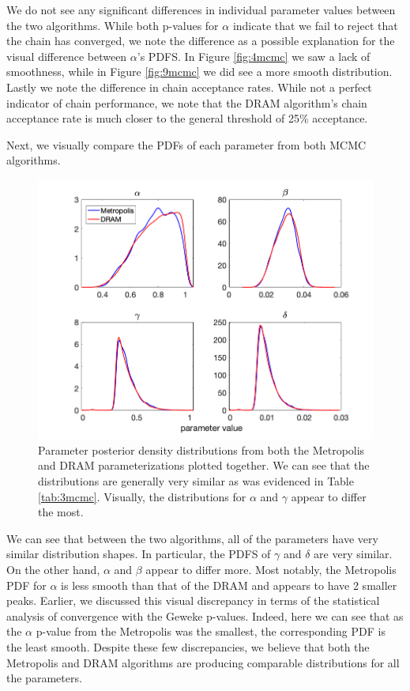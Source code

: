 We do not see any significant differences in individual parameter values between the two algorithms. While both p-values for $\alpha$ indicate that we fail to reject that the chain has converged, we note the difference as a possible explanation for the visual difference between $\alpha$'s PDFS. In Figure \ref{fig:4mcmc} we saw a lack of smoothness, while in Figure \ref{fig:9mcmc} we did see a more smooth distribution. Lastly we note the difference in chain acceptance rates. While not a perfect indicator of chain performance, we note that the DRAM algorithm's chain acceptance rate is much closer to the general threshold of 25\% acceptance. 

\par Next, we visually compare the PDFs of each parameter from both MCMC algorithms.
\begin{figure}[H]
    \centering
    \includegraphics[width=15cm]{MCMC_figs/met_lv_final/overlaid_param_pdfs.png}
    \caption{Parameter posterior density distributions from both the Metropolis and DRAM parameterizations plotted together. We can see that the distributions are generally very similar as was evidenced in Table \ref{tab:3mcmc}. Visually, the distributions for $\alpha$ and $\gamma$ appear to differ the most.}
    \label{fig:overlayPDF_met}
\end{figure}
We can see that between the two algorithms, all of the parameters have very similar distribution shapes. In particular, the PDFS of $\gamma$ and $\delta$ are very similar. On the other hand, $\alpha$ and $\beta$ appear to differ more. Most notably, the Metropolis PDF for $\alpha$ is less smooth than that of the DRAM and appears to have 2 smaller peaks. Earlier, we discussed this visual discrepancy in terms of the statistical analysis of convergence with the Geweke p-values. Indeed, here we can see that as the $\alpha$ p-value from the Metropolis was the smallest, the corresponding PDF is the least smooth. Despite these few discrepancies, we believe that both the Metropolis and DRAM algorithms are producing comparable distributions for all the parameters.
